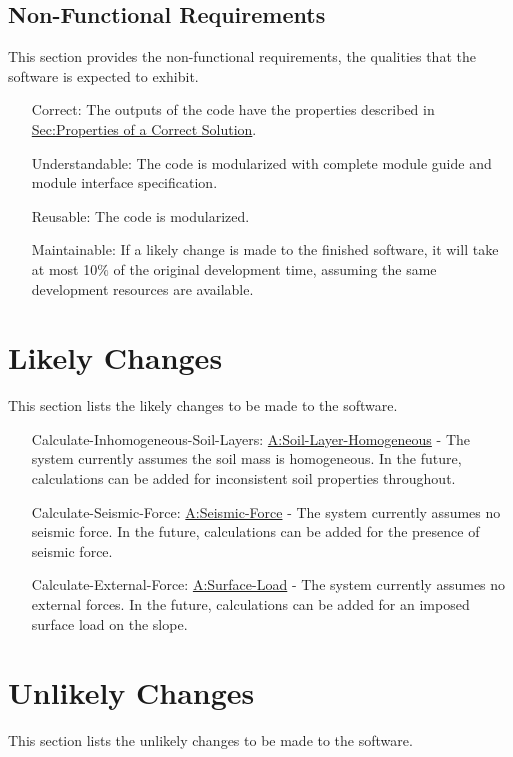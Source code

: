 \documentclass[12pt]{article}
\begin{document}
\subsection{Non-Functional Requirements}
\label{Sec:NFRs}
This section provides the non-functional requirements, the qualities that the software is expected to exhibit.

\begin{itemize}
\item[Correct:\phantomsection\label{correct}]{The outputs of the code have the properties described in \hyperref[Sec:CorSolProps]{Sec:Properties of a Correct Solution}.}
\item[Understandable:\phantomsection\label{understandable}]{The code is modularized with complete module guide and module interface specification.}
\item[Reusable:\phantomsection\label{reusable}]{The code is modularized.}
\item[Maintainable:\phantomsection\label{maintainable}]{If a likely change is made to the finished software, it will take at most 10$\%$ of the original development time, assuming the same development resources are available.}
\end{itemize}
\section{Likely Changes}
\label{Sec:LCs}
This section lists the likely changes to be made to the software.

\begin{itemize}
\item[Calculate-Inhomogeneous-Soil-Layers:\phantomsection\label{LC_inhomogeneous}]{\hyperref[assumpSLH]{A:Soil-Layer-Homogeneous} - The system currently assumes the soil mass is homogeneous. In the future, calculations can be added for inconsistent soil properties throughout.}
\item[Calculate-Seismic-Force:\phantomsection\label{LC_seismic}]{\hyperref[assumpSF]{A:Seismic-Force} - The system currently assumes no seismic force. In the future, calculations can be added for the presence of seismic force.}
\item[Calculate-External-Force:\phantomsection\label{LC_external}]{\hyperref[assumpSL]{A:Surface-Load} - The system currently assumes no external forces. In the future, calculations can be added for an imposed surface load on the slope.}
\end{itemize}
\section{Unlikely Changes}
\label{Sec:UCs}
This section lists the unlikely changes to be made to the software.
\end{document}
